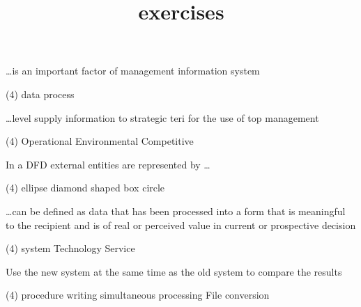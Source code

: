 \documentclass{article}
\title{exercises}
\date{}
\author{}
\begin{document}
\begin{questions}
    \begin{exercise}
        \dots is an important factor of management information system
        \begin{choice}(4)
            \choice {}
            \choice data
            \choice process
        \end{choice}
    \end{exercise}
    \begin{exercise}
        \dots level supply information to strategic teri for the use of top management
        \begin{choice}(4)
            \choice Operational
            \choice Environmental
            \choice Competitive
            \choice {}
        \end{choice}
    \end{exercise}
    \begin{exercise}
        In a DFD external entities are represented by \dots
        \begin{choice}(4)
            \choice {}
            \choice ellipse
            \choice diamond shaped box
            \choice circle
        \end{choice}
    \end{exercise}
    \begin{exercise}
        \dots can be defined as data that has been processed into a form that is meaningful to the recipient and is of real or perceived value in current or prospective decision
        \begin{choice}(4)
            \choice system
            \choice {}
            \choice Technology
            \choice Service
        \end{choice}
    \end{exercise}
    \begin{exercise}
        Use the new system at the same time as the old system to compare the results
        \begin{choice}(4)
            \choice procedure writing
            \choice simultaneous processing
            \choice {}
            \choice File conversion
        \end{choice}
    \end{exercise}
    \begin{exercise}

\end{exercise}
\end{questions}
\end{document}
